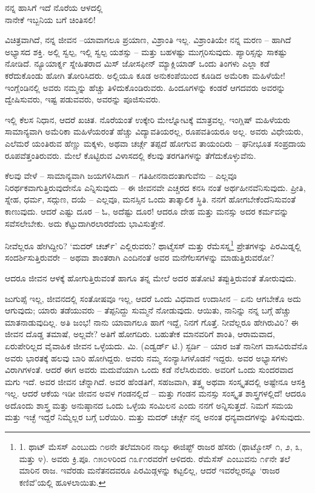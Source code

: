 \begin{myquote}
ನನ್ನ ಹಾಸಿಗೆ ಇದೆ ನೊರೆಯ ಆಳದಲ್ಲಿ\\ನಾನೇಕೆ ಇಬ್ಬನಿಯ ಬಗೆ ಚಿಂತಿಸಲಿ!
\end{myquote}

ವಿಚಿತ್ರವಾಗಿದೆ, ನನ್ನ ಜೀವನ –ಯಾವಾಗಲೂ ಪ್ರಯಾಣ, ವಿಶ್ರಾಂತಿ ಇಲ್ಲ. ವಿಶ್ರಾಂತಿಯೇ ನನ್ನ ಮರಣ – ಹಾಗಿದೆ ಅಭ್ಯಾಸದ ಶಕ್ತಿ. ಅಲ್ಲಿ ಸ್ವಲ್ಪ, ಇಲ್ಲಿ ಸ್ವಲ್ಪ ಯಶಸ್ಸು – ಮತ್ತು ಬಹಳಷ್ಟು ಮುಗ್ಗರಿಸುವುದು. ಪ್ಯಾರಿಸ್ಸನ್ನು ಸಾಕಷ್ಟು ನೋಡಿದೆ. ನ್ಯೂಯಾರ್ಕ್ನ ಸ್ನೇಹಿತರಾದ ಮಿಸ್ ಜೋಸಫೀನ್ ಮ್ಯಾಕ್ಲಿಯಾಡ್ ಒಂದು ತಿಂಗಳು ಎಲ್ಲಾ ಕಡೆ ಕರೆದುಕೊಂಡು ಹೋಗಿ ತೋರಿಸಿದರು. ಅಲ್ಲಿಯೂ ಕೂಡ ಅನುಕಂಪೆಯಿಂದ ಕೂಡಿದ ಅಮೆರಿಕಾ ಮಹಿಳೆಯೇ! ಇಂಗ್ಲೆಂಡಿನಲ್ಲಿ ಅವರು ನಮ್ಮನ್ನು ಹೆಚ್ಚು ತಿಳಿದುಕೊಂಡಿರುವರು. ಹಿಂದೂಗಳನ್ನು ಕಂಡರೆ ಆಗದವರು ಅವರನ್ನು ದ್ವೇಷಿಸುವರು, ಇಷ್ಟ ಪಡುವವರು, ಅವರನ್ನು ಪೂಜಿಸುವರು.

ಇಲ್ಲಿ ಕೆಲಸ ನಿಧಾನ, ಆದರೆ ಖಚಿತ. ನೊರೆಯಂತೆ ಉಕ್ಕೇರಿ ಮೇಲ್ನೋಟಕ್ಕೆ ಮಾತ್ರವಲ್ಲ. ಇಂಗ್ಲಿಷ್ ಮಹಿಳೆಯರು ಸಾಮಾನ್ಯವಾಗಿ ಅಮೆರಿಕಾ ಮಹಿಳೆಯರಂತೆ ಹೆಚ್ಚು ವಿದ್ಯಾವತಿಯರಲ್ಲ, ರೂಪವತಿಯರೂ ಅಲ್ಲ. ಅವರು ವಿಧೇಯರು, ಎಲೆಮರೆ ಯಂತಿರುವ ಹೆಣ್ಣು ಮಕ್ಕಳು, ಅಥವಾ ಚರ್ಚ್ಗೆ ತಪ್ಪದೆ ಹೋಗುವ ತಾಯಂದಿರು – ಘನೀಭೂತ ಸಂಪ್ರದಾಯ ರೂಪವೆತ್ತಂತಿರುವರು. ಮೇಲೆ ಕೊಟ್ಟಿರುವ ವಿಳಾಸದಲ್ಲಿ ಕೆಲವು ತರಗತಿಗಳನ್ನು ತೆಗೆದುಕೊಳ್ಳುವೆನು.

ಕೆಲವು ವೇಳೆ – ಸಾಮಾನ್ಯವಾಗಿ ಜಯಗಳಿಸಿದಾಗ – ಗತಿಹೀನನಾದಂತಾಗುವೆನು – ಎಲ್ಲವೂ ನಿರರ್ಥಕವಾಗುತ್ತಿರುವುದೇನೊ ಎನ್ನಿಸುವುದು – ಈ ಜೀವನವೇ ಎಚ್ಚರದ ಕನಸಿ ನಂತೆ ಅರ್ಥಹೀನವೆನಿಸುವುದು. ಪ್ರೀತಿ, ಸ್ನೇಹ, ಧರ್ಮ, ಸದ್ಗುಣ, ದಯೆ – ಎಲ್ಲವೂ, ಮನಸ್ಸಿನ ಒಂದು ತಾತ್ಕಾಲಿಕ ಸ್ಥಿತಿ. ನನಗೆ ಹೋಗಬೇಕೆಂದೆನಿಸುವಂತೆ ಕಾಣುವುದು. ಆದರೆ ಎಷ್ಟು ದೂರ – ಓ, ಅದೆಷ್ಟು ದೂರ! ಆದರೂ ದೇಹ ಮತ್ತು ಮನಸ್ಸು ಅದರ ಕರ್ಮವನ್ನು ಸವೆಸಲೇಬೇಕು. ಅದು ಕೆಟ್ಟುದಾಗಿರಲಾರದೆಂದು ಭಾವಿಸುತ್ತೇನೆ.

ನೀವೆಲ್ಲರೂ ಹೇಗಿದ್ದೀರಿ? ‘ಮದರ್ ಚರ್ಚ್’ ಎಲ್ಲಿರುವರು? ಥಾಟ್ಮೆಸಸ್ ಮತ್ತು ರೆಮೆಸಸ್ನ\footnote{1. ಥಾಟ್ ಮೆಸಸ್ ಎಂಬುದು ೧೮ನೇ ತಲೆಮಾರಿನ ನಾಲ್ಕು ಈಜಿಪ್ಟ್ ರಾಜರ ಹೆಸರು (ಥಾಟ್ಮೋಸ್ ೧, ೨, ೩, ಮತ್ತು ೪). ಅವರು ಕ್ರಿ.ಪೂ. ೧೫೦೪ರಿಂದ ೧೩೯೧ರವರೆಗೆ ಆಳಿದರು. ರೆಮೆಸೆಸ್ ಎಂಬುವನು ೧೯ನೇ ತಲೆ ಮಾರಿನ ರಾಜ. ಇವೆರಡು ಮನೆತನದವರೂ ಪಿರಮಿಡ್ಗಳನ್ನು ಕಟ್ಟಲಿಲ್ಲ, ಆದರೆ ಇವರೆಲ್ಲರನ್ನೂ ‘ರಾಜರ ಕಣಿವೆ’ಯಲ್ಲಿ ಹೂಳಲಾಯಿತು.} ಪ್ರೇತಗಳನ್ನು ಪಿರಮಿಡ್ನಲ್ಲಿ ಸಂದರ್ಶಿಸುತ್ತಿರುವರೇ – ಅಥವಾ ಶಾಂತರಾಗಿ ಎಂದಿನಂತೆ ಅವರ ಮನೆಗೆಲಸಗಳನ್ನು ಮಾಡುತ್ತಿರುವರೋ?

ಆದರೂ ಜೀವನ ಆಳಕ್ಕೆ ಹೋಗುತ್ತಿರುವಂತೆ ಹಾಗೂ ತನ್ನ ಮೇಲೆ ಅದರ ಹತೋಟಿ ತಪ್ಪುತ್ತಿರುವಂತೆ ತೋರುವುದು.

ಜುಗುಪ್ಸೆ ಇಲ್ಲ, ಜೀವನದಲ್ಲಿ ಸಂತೋಷವೂ ಇಲ್ಲ, ಆದರೆ ಒಂದು ವಿಧವಾದ ಉದಾಸೀನ – ಏನು ಆಗಬೇಕೊ ಅದು ಆಗುವುದು; ಯಾರು ತಡೆಯುವರು – ತೆಪ್ಪನಿದ್ದು ಸುಮ್ಮನೆ ನೋಡುವುದು. ಆಯಿತು, ನಾನಿನ್ನು ನನ್ನ ಬಗ್ಗೆ ಹೆಚ್ಚು ಮಾತನಾಡುವುದಿಲ್ಲ. ಅತಿ ಜಂಭ! ನಾನು ಯಾವಾಗಲೂ ಹಾಗೆ ಇದ್ದೆ, ನಿನಗೆ ಗೊತ್ತೆ. ನೀವೆಲ್ಲರೂ ಹೇಗಿರುವಿರಿ? ಈ ಜೀವನ ದೊಡ್ಡ ತಮಾಷೆ, ಅಲ್ಲವೇ? ಅತಿಗೆ ಹೋಗದಿರು. ಬಹುತೇಕ ಮಾನವರಿಗೆ ಶಾಂತಿ, ಆರಾಮವಾದ, ಏರುಪೇರಿಲ್ಲದ ವೈವಾಹಿಕ ಜೀವನ ಒಳ್ಳೆಯದು. ಮಿ. (ಎಡ್ವರ್ಡ್ ಟಿ.) ಸ್ಟರ್ಡಿ – ಯಾರ ಜತೆ ನಾನೀಗ ವಾಸವಿರುವೆನೊ ಅವರು ಭಾರತಕ್ಕೆ ಹಲವು ಬಾರಿ ಹೋಗಿದ್ದರು. ಅವರು ನಮ್ಮ ಸಂನ್ಯಾಸಿಗಳೊಡನೆ ಇದ್ದರು. ಅವರ ಅಭ್ಯಾಸಗಳು ವಿರಾಗಿಗಳಂತೆ. ಆದರೆ ಈಗ ಅವರು ಮದುವೆಯಾಗಿ ಒಂದು ಕಡೆ ನೆಲೆಸಿರುವರು. ಅವರಿಗೆ ಒಂದು ಸುಂದರವಾದ ಮಗು ಇದೆ. ಅವರ ಜೀವನ ಚೆನ್ನಾಗಿದೆ. ಅವರ ಹೆಂಡತಿಗೆ, ಸಹಜವಾಗಿ, ತತ್ತ್ವ ಅಥವಾ ಸಂಸ್ಕೃತದಲ್ಲಿ ಅಷ್ಟೇನೂ ಆಸಕ್ತಿ ಇಲ್ಲ. ಆದರೆ ಆಕೆಯ ಇಡೀ ಜೀವನ ಅವಳ ಗಂಡನಲ್ಲಿದೆ – ಮತ್ತು ಗಂಡನ ಮನಸ್ಸು ಸಂಸ್ಕೃತ ಶಾಸ್ತ್ರಗಳಲ್ಲಿದೆ! ಆದರೂ ಅದೊಂದು ಶಾಸ್ತ್ರ ಮತ್ತು ಅನುಷ್ಠಾನದ ಒಂದು ಒಳ್ಳೆಯ ಸಂಮಿಲನ ಎಂದು ನನಗೆ ಅನ್ನಿಸುತ್ತದೆ. ನಿಮಗೆ ಸಮಯ ಮತ್ತು ಇಚ್ಛೆ ಇದ್ದರೆ ನಿಮ್ಮೆಲ್ಲರ ಬಗ್ಗೆ ಬರೆಯಿರಿ. ಮತ್ತು ಮದರ್ ಚರ್ಚ್ಗೆ ನನ್ನ ಅನಂತ ಧನ್ಯವಾದಗಳನ್ನು ತಿಳಿಸುವುದು.

